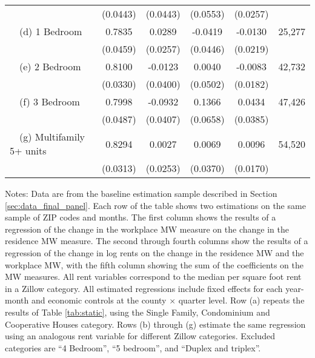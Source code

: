 \begin{landscape}
\begin{table}[ht!]
\begin{tabular}{@{}lccccc@{}}
                                                 & (0.0443) & (0.0443) & (0.0553) & (0.0257) &      \\
        $\quad$(d) 1 Bedroom                     &  0.7835  &  0.0289  &  -0.0419  &  -0.0130  & 25,277 \\
                                                 & (0.0459) & (0.0257) & (0.0446) & (0.0219) &      \\
        $\quad$(e) 2 Bedroom                     &  0.8100  &  -0.0123  &  0.0040  &  -0.0083  & 42,732 \\
                                                 & (0.0330) & (0.0400) & (0.0502) & (0.0182) &      \\
        $\quad$(f) 3 Bedroom                     &  0.7998  &  -0.0932  &  0.1366  &  0.0434  & 47,426 \\
                                                 & (0.0487) & (0.0407) & (0.0658) & (0.0385) &      \\
        $\quad$(g) Multifamily 5+ units          &  0.8294  &  0.0027  &  0.0069  &  0.0096  & 54,520 \\
                                                 & (0.0313) & (0.0253) & (0.0370) & (0.0170) &      \\ \bottomrule
    \end{tabular}

    \begin{minipage}{.95\linewidth} \footnotesize
        \vspace{2mm}
        Notes:
        Data are from the baseline estimation sample described in Section 
        \ref{sec:data_final_panel}.
        Each row of the table shows two estimations on the same sample of ZIP 
        codes and months.
        The first column shows the results of a regression of the change in the 
        workplace MW measure on the change in the residence MW measure.
        The second through fourth columns show the results of a regression of 
        the change in log rents on the change in the residence MW and the 
        workplace MW, with the fifth column showing the sum of the coefficients 
        on the MW measures.
        All rent variables correspond to the median per square foot rent in a 
        Zillow category.
        All estimated regressions include fixed effects for each year-month and 
        economic controls at the county $\times$ quarter level.
        Row (a) repeats the results of Table \ref{tab:static}, using the 
        Single Family, Condominium and Cooperative Houses category.
        Rows (b) through (g) estimate the same regression using an analogous 
        rent variable for different Zillow categories.
        Excluded categories are ``4 Bedroom'', ``5 bedroom'', and 
        ``Duplex and triplex''.
    \end{minipage}
\end{table}
\end{landscape}
